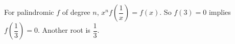 For palindromic $f$ of degree $n$, $x^nf\!\left(\dfrac1x\right)=f(x)$. So $f(3)=0$ implies $f\!\left(\dfrac13\right)=0$. Another root is $\boxed{\dfrac13}$.
